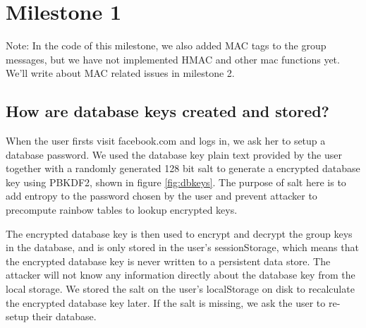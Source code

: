
\usepackage{graphicx,amssymb,amsmath,enumerate}
\usepackage{courier}
\usepackage{color}
\usepackage{listings}
\usepackage{fancyvrb}
\usepackage{stmaryrd}

\oddsidemargin 0in
\evensidemargin 0in
\textwidth 6.5in
\topmargin -0.5in
\textheight 9.0in




\pagestyle{myheadings}  %


\section{Milestone 1}

Note: In the code of this milestone, we also added MAC tags to the group messages, but we have not implemented HMAC and other mac functions yet. We'll write about MAC related issues in milestone 2. 

\subsection{How are database keys created and stored?}

When the user firsts visit facebook.com and logs in, we ask her to setup a database password. We used the database key plain text provided by the user together with a randomly generated 128 bit salt to generate a encrypted database key using PBKDF2, shown in figure \ref{fig:dbkeys}. The purpose of salt here is to add entropy to the password chosen by the user and prevent attacker to precompute rainbow tables to lookup encrypted keys. 

The encrypted database key is then used to encrypt and decrypt the group keys in the database, and is only stored in the user's sessionStorage, which means that the encrypted database key is never written to a persistent data store. The attacker will not know any information directly about the database key from the local storage. We stored the salt on the user's localStorage on disk to recalculate the encrypted database key later. If the salt is missing, we ask the user to re-setup their database. 

